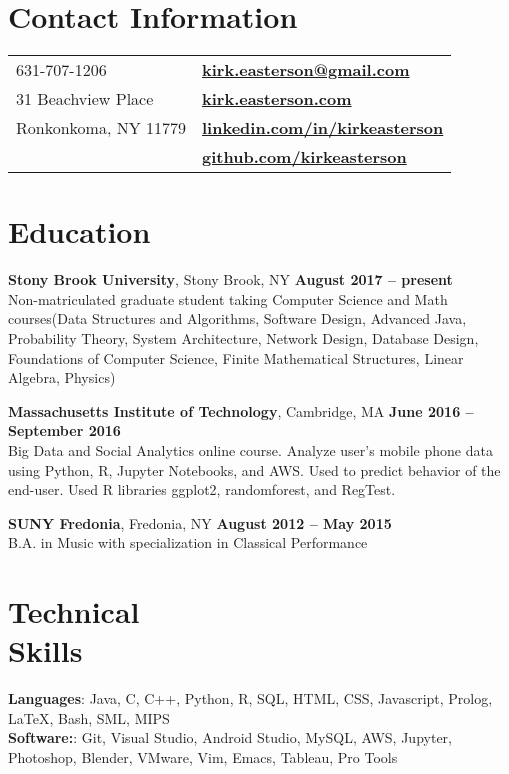\documentclass[margin,line]{res}
\begin{document}

\begin{resume}
\section{\sc Contact Information}

\vspace{.05in}
\begin{tabular}{@{}p{3.5in}p{3in}}
631-707-1206 & {\bf \textcolor{blue}{\href{mailto:kirk.easterson@gmail.com}{kirk.easterson@gmail.com}}} \\
31 Beachview Place &  {\bf \textcolor{blue}{\href{http://www.kirkeasterson.com}{kirk.easterson.com}}}\\
Ronkonkoma, NY 11779 &  {\bf \textcolor{blue}{\href{http://www.linkedin.com/in/kirkeasterson}{linkedin.com/in/kirkeasterson}}}\\
& {\bf \textcolor{blue}{\href{https://www.github.com/kirkeasterson}{github.com/kirkeasterson}}}
\end{tabular}

\section{\sc Education}
{\bf Stony Brook University}, Stony Brook, NY \hfill {\bf August 2017 -- present}\\
Non-matriculated graduate student taking Computer Science and Math courses(Data Structures and Algorithms, Software Design, Advanced Java, Probability Theory, System Architecture, Network Design, Database Design, Foundations of Computer Science, Finite Mathematical Structures, Linear Algebra, Physics)

{\bf Massachusetts Institute of Technology}, Cambridge, MA \hfill {\bf June 2016 -- September 2016}\\
Big Data and Social Analytics online course. Analyze user's mobile phone data using Python, R, Jupyter Notebooks, and AWS. Used to predict behavior of the end-user. Used R libraries ggplot2, randomforest, and RegTest.

{\bf SUNY Fredonia}, Fredonia, NY \hfill {\bf August 2012 -- May 2015}\\
B.A. in Music with specialization in Classical Performance

\section{\sc Technical\\Skills}
{\bf Languages}:  Java, C, C++, Python, R, SQL, HTML, CSS, Javascript, Prolog, {\LaTeX}, Bash, SML, MIPS\\
{\bf Software:}: Git, Visual Studio, Android Studio, MySQL, AWS, Jupyter, Photoshop, Blender, VMware, Vim, Emacs, Tableau, Pro Tools


\end{resume}
\end{document}
